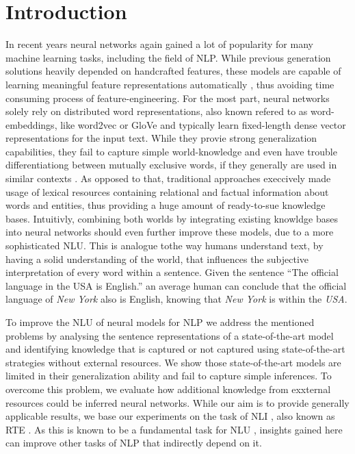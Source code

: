 \section{Introduction}
In recent years neural networks again gained a lot of popularity for many machine learning tasks, including the field of \ac{NLP}. While previous generation solutions heavily depended on handcrafted features, these models are capable of learning meaningful feature representations automatically \citep{bengio2013representation}, thus avoiding time consuming process of feature-engineering. For the most part, neural networks solely rely on distributed word representations, also known refered to as word-embeddings, like word2vec \citep{mikolov2013distributed} or GloVe \citep{pennington2014glove} and typically learn fixed-length dense vector representations for the input text. While they provie strong generalization capabilities, they fail to capture simple world-knowledge \citep{celikyilmaz2010enriching} and even have trouble differentiationg between mutually exclusive words, if they generally are used in similar contexts \citep{vulic2017morph}. As opposed to that, traditional approaches execcively made usage of lexical resources containing relational and factual information about words and entities, thus providing a huge amount of ready-to-sue knowledge bases. Intuitivly, combining both worlds by integrating existing knowldge bases into neural networks should even further improve these models, due to a more sophisticated \ac{NLU}. This is analogue tothe way humans understand text, by having a solid understanding of the world, that influences the subjective interpretation of every word within a sentence. Given the sentence ``The official language in the USA is English.'' an average human can conclude that the official language of \textit{New York} also is English, knowing that \textit{New York} is within the \textit{USA}.
\newline

To improve the \ac{NLU} of neural models for \ac{NLP} we address the mentioned problems by analysing the sentence representations of a state-of-the-art model and identifying knowledge that is captured or not captured using state-of-the-art strategies without external resources. We show those state-of-the-art models are limited in their generalization ability and fail to capture simple inferences. To overcome this problem, we evaluate how additional knowledge from exxternal resources could be inferred neural networks. While our aim is to provide generally applicable results, we base our experiments on the task of \ac{NLI} \citep{bowman2015large}, also known as \ac{RTE} \citep{dagan2006pascal}. As this is known to be a fundamental task for \ac{NLU} \citep{maccartney2007natural}, insights gained here can improve other tasks of \ac{NLP} that indirectly depend on it. 

